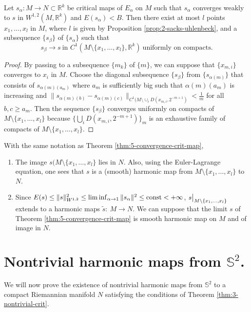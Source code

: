 \begin{theorem}
\label{thm:5-convergence-crit-map}
Let \(s_\alpha:M \longrightarrow N\subset \mathbb{R}^k\) be critical maps of \(E_\alpha\) on \(M\) such that \(s_\alpha\) converges weakly to \(s\) in \(W^{1,2}(M,
\mathbb{R}^k)\) and \(E(s_\alpha) < B\). Then there exist at most \(l\) points \(x_1,\dots, x_l\) in \(M\), where \(l\) is given by Proposition
\ref{prop:2-sacks-uhlenbeck}, and a subsequence \(\{s_\beta\}\) of \(\{s_\alpha\}\) such that
\[
s_\beta \longrightarrow  s \ \text{in } C^1(M\setminus\{x_1,\dots, x_l\}, \mathbb{R}^k) \
\text{uniformly on compacts}.
\]
\end{theorem}
\begin{proof}
By passing to a subsequence \(\{m_k\}\) of \(\{ m\}\), we can suppose that
\(\{x_{m,i}\}\) converges to \(x_i\) in \(M\). Choose the diagonal subsequence \(\{s_\beta\}\) from \(\{s_{\alpha(m)}\}\) that consists of \(s_{\alpha(m)(a_m)}\)
where \(a_m\) is sufficiently big such that \(\alpha(m)(a_m)\) is increasing and
\(\|s_{\alpha(m)(b)} - s_{\alpha(m)(c)} \|_{C^1(M\setminus \cup_i D(x_{m,i},2^{-m+1})} <
\frac{1}{m}\) for all \(b,c\geq a_m\). Then the sequence \(\{s_\beta\}\) converges
uniformly on compacts of \(M\setminus\{x_1,\dots,x_l\}\) because \(\{\bigcup_i
D(x_{m,i}, 2^{-m+1})\}_m\) is an exhaustive family of compacts of \(M\setminus\{x_1,\dots,x_l\}\).
\end{proof}

\begin{remark}
With the same notation as Theorem \ref{thm:5-convergence-crit-map},
\begin{enumerate}
\item The image \(s(M\setminus\{x_1,\dots,x_l\}\) lies in \(N\). Also, using the
Euler-Lagrange equation, one sees that \(s\) is a (smooth) harmonic map from \(M\setminus\{x_1,\dots, x_l\}\) to \(N\).
\item Since \(E(s) \leq \|s\|_{W^{1,2}}^2 \leq \liminf_{\alpha\to 1} \|s_\alpha\|^2 \leq
   \mathop{\rm const }\nolimits<+\infty\), \(\restr{s}{M\setminus\{x_1,\dots, x_l\}}\) extends to a harmonic
maps \(\tilde s:\ M \longrightarrow N\). We can suppose that the limit \(s\) of
Theorem \ref{thm:5-convergence-crit-map} is smooth harmonic map on \(M\) and of image
in \(N\).
\end{enumerate}
\end{remark}


\section{Nontrivial harmonic maps from \(\mathbb{S}^2\).}
\label{sec:org5815024}
We will now prove the existence of nontrivial harmonic maps from \(\mathbb{S}^2\) to a
compact Riemannian manifold \(N\) satisfying the conditions of Theorem
\ref{thm:3-nontrivial-crit}. 

